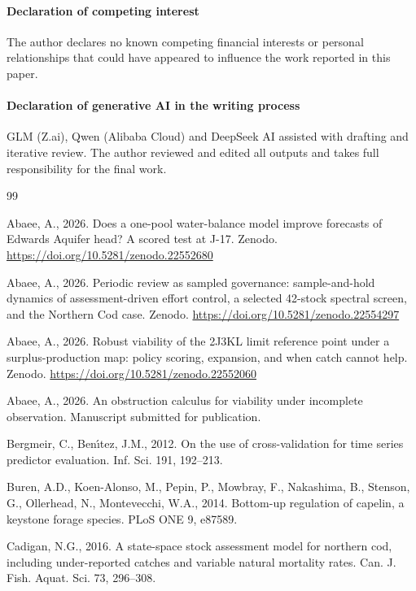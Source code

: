 \paragraph{Declaration of competing interest} The author declares no known competing financial interests or personal relationships that could have appeared to influence the work reported in this paper.

\paragraph{Declaration of generative AI in the writing process} GLM (Z.ai), Qwen (Alibaba Cloud) and DeepSeek AI assisted with drafting and iterative review. The author reviewed and edited all outputs and takes full responsibility for the final work.

\begin{thebibliography}{99}
\providecommand{\natexlab}[1]{#1}

Abaee, A., 2026. Does a one-pool water-balance model improve forecasts of Edwards Aquifer head? A scored test at J-17. Zenodo. \url{https://doi.org/10.5281/zenodo.22552680}

Abaee, A., 2026. Periodic review as sampled governance: sample-and-hold dynamics of assessment-driven effort control, a selected 42-stock spectral screen, and the Northern Cod case. Zenodo. \url{https://doi.org/10.5281/zenodo.22554297}

Abaee, A., 2026. Robust viability of the 2J3KL limit reference point under a surplus-production map: policy scoring, expansion, and when catch cannot help. Zenodo. \url{https://doi.org/10.5281/zenodo.22552060}

Abaee, A., 2026. An obstruction calculus for viability under incomplete observation. Manuscript submitted for publication.

Bergmeir, C., Ben{\'\i}tez, J.M., 2012. On the use of cross-validation for time series predictor evaluation. Inf. Sci. 191, 192--213.

Buren, A.D., Koen-Alonso, M., Pepin, P., Mowbray, F., Nakashima, B., Stenson, G., Ollerhead, N., Montevecchi, W.A., 2014. Bottom-up regulation of capelin, a keystone forage species. PLoS ONE 9, e87589.

Cadigan, N.G., 2016. A state-space stock assessment model for northern cod, including under-reported catches and variable natural mortality rates. Can. J. Fish. Aquat. Sci. 73, 296--308.


\end{thebibliography}
